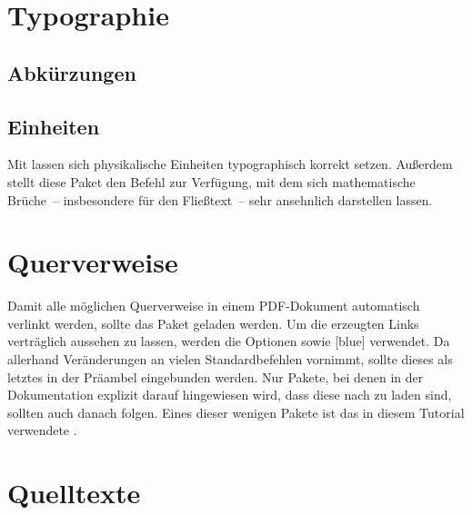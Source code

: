 \documentclass[%
  english,ngerman,%
  geometry=no,DIV=12,automark,%
]{tudscrartcl}
\begin{document}
\section{Typographie}
\begin{Preamble}
\usepackage{microtype}

\end{Preamble}

\subsection{Abkürzungen}


\subsection{Einheiten}
\label{sec:units}
Mit  lassen sich physikalische Einheiten typographisch korrekt 
setzen. Außerdem stellt diese Paket den Befehl  zur Verfügung, 
mit dem sich mathematische Brüche~-- insbesondere für den Fließtext~-- sehr 
ansehnlich darstellen lassen.
%
\begin{Preamble}
\usepackage{units}

\end{Preamble}




\section{Querverweise}
\label{sec:references}
%
Damit alle möglichen Querverweise in einem PDF-Dokument automatisch verlinkt 
werden, sollte das Paket  geladen werden. Um die erzeugten 
Links verträglich aussehen zu lassen, werden die Optionen  
sowie [blue] verwendet. Da  allerhand 
Veränderungen an vielen Standardbefehlen vornimmt, sollte dieses als letztes in 
der Präambel eingebunden werden. Nur Pakete, bei denen in der Dokumentation 
explizit darauf hingewiesen wird, dass diese nach  zu laden 
sind, sollten auch danach folgen. Eines dieser wenigen Pakete ist das in diesem 
Tutorial verwendete . 
%
\begin{Preamble}
\usepackage[colorlinks,linkcolor=blue]{hyperref}
\end{Preamble}



\section{Quelltexte}
%
\end{document}
